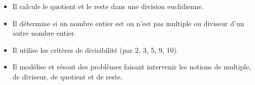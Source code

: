 \begin{prerequis}[Objectifs de 5\up{e}]  
    \begin{itemize}  
        \item Il calcule le quotient et le reste dans une division euclidienne.
        \item Il détermine si un nombre entier est ou n’est pas multiple ou diviseur d’un autre nombre entier.
        \item Il utilise les critères de divisibilité (par 2, 3, 5, 9, 10).
        \item Il modélise et résout des problèmes faisant intervenir les notions de multiple, de diviseur, de quotient et de reste.
    \end{itemize}
\end{prerequis}